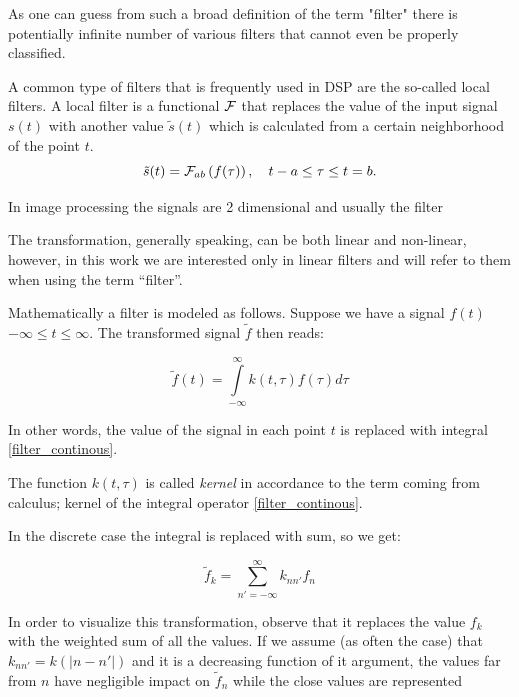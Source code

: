\documentclass[11pt]{book}
\begin{document}
As one can guess from such a broad definition of the term "filter" there is potentially infinite number of various filters that cannot even be properly classified. 

A common type of filters that is frequently used in DSP are the so-called local filters. A local filter is a functional $\cal{F}$ that replaces the value of the input signal $s(t)$ with another value $\tilde{s}(t)$ which is calculated from a certain neighborhood of the point $t$. 
\begin{equation}
\tilde{s}(t) = {\cal F}_{ab}\left(f(\tau)\right), \quad t-a \leq \tau\leq t=b.
\end{equation}

In image processing the signals are 2 dimensional and usually the filter 

The transformation, generally speaking,  can be both linear and non-linear, however, in this work we are interested only in linear filters and will refer to them when using the term ``filter''.





Mathematically a filter is modeled as follows. Suppose we have a signal $f(t)$ $-\infty \leq t \leq \infty$. The transformed signal $\tilde{f}$ then reads:

\begin{equation}
 \tilde{f}(t) = \int\limits_{-\infty}^\infty k(t,\tau) f(\tau) d\tau\label{filter_continous}
\end{equation}

In other words, the value of the signal in each point $t$ is replaced with integral \eqref{filter_continous}. 

The function $k(t,\tau)$ is called {\it kernel} in accordance to the term coming from calculus; kernel of the integral operator \eqref{filter_continous}.

In the discrete case the integral is replaced with sum, so we get:

\begin{equation}
\tilde{f}_k = \sum\limits_{n'=-\infty}^\infty k_{nn'} f_n
\end{equation}

In order to visualize this transformation, observe that it replaces the value $f_k$ with the weighted sum of all the  values. If we assume (as often the case) that $k_{nn'} = k(\left|n-n'\right|)$ and it is a decreasing function of it argument, the values far from $n$ have negligible impact on $\tilde{f}_n$ while the close values are represented 
\end{document}
